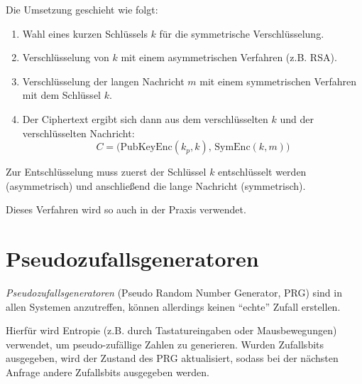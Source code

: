         Die Umsetzung geschieht wie folgt:
        \begin{enumerate}
        	\item Wahl eines kurzen Schlüssels \(k\) für die symmetrische Verschlüsselung.
        	\item Verschlüsselung von \(k\) mit einem asymmetrischen Verfahren (z.B. RSA).
        	\item Verschlüsselung der langen Nachricht \(m\) mit einem symmetrischen Verfahren mit dem Schlüssel \(k\).
        	\item Der Ciphertext ergibt sich dann aus dem verschlüsselten \(k\) und der verschlüsselten Nachricht:
	        	\begin{equation*}
		        	C = \big(\textrm{PubKeyEnc}(k_p, k),\, \textrm{SymEnc}(k, m)\big)
	        	\end{equation*}
        \end{enumerate}
        Zur Entschlüsselung muss zuerst der Schlüssel \(k\) entschlüsselt werden (asymmetrisch) und anschließend die lange Nachricht (symmetrisch).
        
        Dieses Verfahren wird so auch in der Praxis verwendet.

    \section{Pseudozufallsgeneratoren}
        \textit{Pseudozufallsgeneratoren} (Pseudo Random Number Generator, PRG) sind in allen Systemen anzutreffen, können allerdings keinen \enquote{echte} Zufall erstellen.
        
        Hierfür wird Entropie (z.B. durch Tastatureingaben oder Mausbewegungen) verwendet, um pseudo-zufällige Zahlen zu generieren. Wurden Zufallsbits ausgegeben, wird der Zustand des PRG aktualisiert, sodass bei der nächsten Anfrage andere Zufallsbits ausgegeben werden.
        
